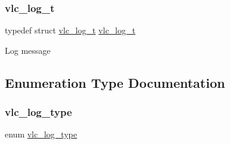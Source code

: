 \subsubsection{\texorpdfstring{vlc\+\_\+log\+\_\+t}{vlc\_log\_t}}
{\footnotesize\ttfamily typedef struct \hyperlink{structvlc__log__t}{vlc\+\_\+log\+\_\+t}  \hyperlink{structvlc__log__t}{vlc\+\_\+log\+\_\+t}}

Log message 

\subsection{Enumeration Type Documentation}
\mbox{\label{group__messages_gaac9d92208890aa567a07ca9a1d758303}} 
\subsubsection{\texorpdfstring{vlc\+\_\+log\+\_\+type}{vlc\_log\_type}}
{\footnotesize\ttfamily enum \hyperlink{group__messages_gaac9d92208890aa567a07ca9a1d758303}{vlc\+\_\+log\+\_\+type}}

